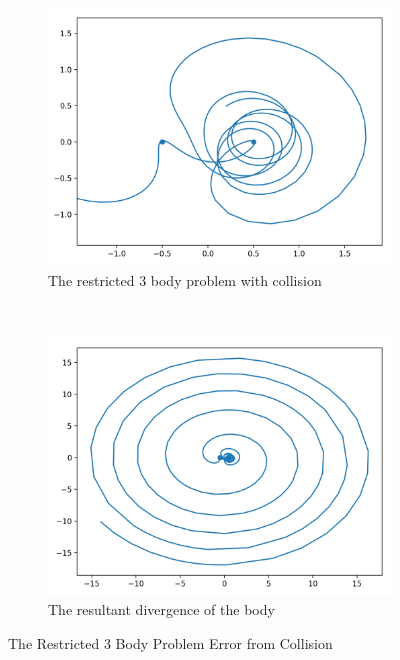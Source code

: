 \documentclass{article}
\begin{document}
\begin{figure}[H]
    \centering
    \begin{subfigure}[b]{0.3\textwidth}
        \includegraphics[width=\textwidth]{images/r3b_collision.png}
        \caption{The restricted 3 body problem with collision}
        \label{fig:r3b_collision}
    \end{subfigure}
    ~
    \begin{subfigure}[b]{0.3\textwidth}
        \includegraphics[width=\textwidth]{images/r3b_collision_whole.png}
        \caption{The resultant divergence of the body}
        \label{fig:r3b_collision_whole}
    \end{subfigure}
    \caption{The Restricted 3 Body Problem Error from Collision}
    \label{fig:singularity}
\end{figure}
\end{document}

